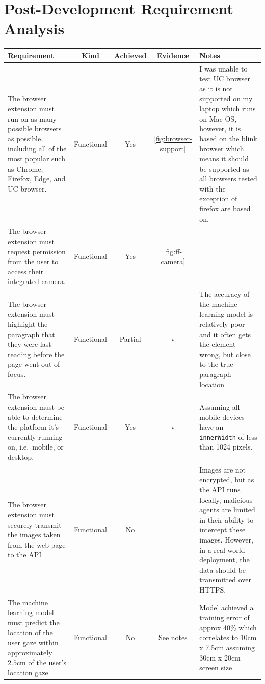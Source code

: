 \documentclass{report}
\begin{document}
\section{Post-Development Requirement Analysis}
\label{sec:post-devel-requirement-analysis}

\begin{center}
\begin{tabularx}{\textwidth}{|X|c|c|c|X|}
    \caption{Analysis of Requirements Compliance Table} \\ 
    \hline
    \textbf{Requirement} & \textbf{Kind} & \textbf{Achieved} & \textbf{Evidence} & \textbf{Notes} \\ 
    \hline

    The browser extension must run on as many possible browsers as possible, including all of the most popular such as Chrome, Firefox, Edge, and UC browser. & Functional & Yes & \autoref{fig:browser-support} & I was unable to test UC browser as it is not supported on my laptop which runs on Mac OS, however, it is based on the blink browser which means it should be supported as all browsers tested with the exception of firefox are based on.  \\
    \hline
    The browser extension must request permission from the user to access their integrated camera. & Functional & Yes & \autoref{fig:ff-camera} & \\
    \hline
    The browser extension must highlight the paragraph that they were last reading before the page went out of focus.  & Functional & Partial & v & The accuracy of the machine learning model is relatively poor and it often gets the element wrong, but close to the true paragraph location \\
    \hline
    The browser extension must be able to determine the platform it's currently running on, i.e.~mobile, or desktop. & Functional & Yes & v & Assuming all mobile devices have an \texttt{innerWidth} of less than 1024 pixels. \\
    \hline
    The browser extension must securely transmit the images taken from the web page to the API & Functional & No & ~ & Images are not encrypted, but as the API runs locally, malicious agents are limited in their ability to intercept these images. However, in a real-world deployment, the data should be transmitted over HTTPS. \\
    \hline
    The machine learning model must predict the location of the user gaze within approximately \(2.5\text{cm}\) of the user's location gaze  & Functional & No & See notes & Model achieved a training error of approx 40\% which correlates to 10cm x 7.5cm assuming 30cm x 20cm screen size \\

\end{tabularx}
\end{center}
\end{document}
